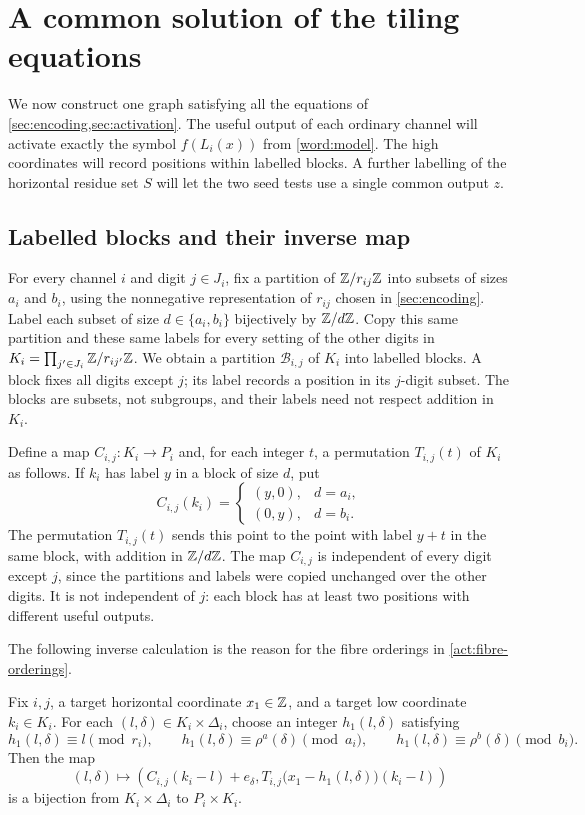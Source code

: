 \section{A common solution of the tiling equations}\label{sec:model}

We now construct one graph satisfying all the equations of
\cref{sec:encoding,sec:activation}.  The useful output of each ordinary
channel will activate exactly the symbol $f(L_i(x))$ from
\cref{word:model}.  The high coordinates will record positions within
labelled blocks.  A further labelling of the horizontal residue set $S$
will let the two seed tests use a single common output $z$.

\subsection{Labelled blocks and their inverse map}

For every channel $i$ and digit $j\in J_i$, fix a partition of
$\mathbb Z/r_{ij}\mathbb Z$ into subsets of sizes $a_i$ and $b_i$, using the
nonnegative representation of $r_{ij}$ chosen in
\cref{sec:encoding}.  Label each subset of size $d\in\{a_i,b_i\}$
bijectively by $\mathbb Z/d\mathbb Z$.  Copy this same partition and these same labels
for every setting of the other digits in
$K_i=\prod_{j'\in J_i}\mathbb Z/r_{ij'}\mathbb Z$.  We obtain a partition
$\mathcal B_{i,j}$ of $K_i$ into labelled blocks.  A block fixes all
digits except $j$; its label records a position in its $j$-digit subset.
The blocks are subsets, not subgroups, and their labels need not respect
addition in $K_i$.

Define a map $C_{i,j}:K_i\to P_i$ and, for each integer $t$, a
permutation $T_{i,j}(t)$ of $K_i$ as follows.  If $k_i$ has label $y$ in
a block of size $d$, put
\[
 C_{i,j}(k_i)=
 \begin{cases}
 (y,0),&d=a_i,\\
 (0,y),&d=b_i.
 \end{cases}
\]
The permutation $T_{i,j}(t)$ sends this point to the point with label
$y+t$ in the same block, with addition in $\mathbb Z/d\mathbb Z$.
The map $C_{i,j}$ is independent
of every digit except $j$, since the partitions and labels were copied
unchanged over the other digits.  It is not independent of $j$: each
block has at least two positions with different useful outputs.

The following inverse calculation is the reason for the fibre
orderings in \cref{act:fibre-orderings}.

\begin{lemma}\label{model:block-inverse}
Fix $i,j$, a target horizontal coordinate $x_1\in\mathbb Z$, and a target
low coordinate $k_i\in K_i$.  For each $(l,\delta)\in K_i\times\Delta_i$,
choose an integer $h_1(l,\delta)$ satisfying
\[
 h_1(l,\delta)\equiv l\pmod{r_i},\qquad
 h_1(l,\delta)\equiv\rho^a(\delta)\pmod{a_i},\qquad
 h_1(l,\delta)\equiv\rho^b(\delta)\pmod{b_i}.
\]
Then the map
\begin{equation}\label{model:block-map}
 (l,\delta)\longmapsto
 \left(
 C_{i,j}(k_i-l)+e_\delta,
 T_{i,j}\bigl(x_1-h_1(l,\delta)\bigr)(k_i-l)
 \right)
\end{equation}
is a bijection from $K_i\times\Delta_i$ to $P_i\times K_i$.
\end{lemma}

